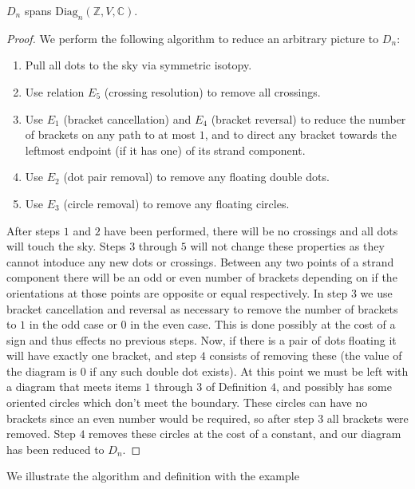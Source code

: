 \documentclass[11pt]{article} %
\begin{document}
\begin{prop}
$D_n$ spans $\text{Diag}_n({\mathbb{Z},V,\mathbb{C}})$.
\end{prop}
\begin{proof}
We perform the following algorithm to reduce an arbitrary picture to $D_n$:
\begin{enumerate}
\item Pull all dots to the sky via symmetric isotopy.
\item Use relation $E_5$ (crossing resolution) to remove all crossings.
\item Use $E_1$ (bracket cancellation) and $E_4$ (bracket reversal) to reduce the number of brackets on any path to at most $1$, and to direct any bracket towards the leftmost endpoint (if it has one) of its strand component.
\item Use $E_2$ (dot pair removal) to remove any floating double dots. 
\item Use $E_3$ (circle removal) to remove any floating circles.
\end{enumerate}
After steps $1$ and $2$ have been performed, there will be no crossings and all dots will touch the sky. Steps $3$ through $5$ will not change these properties as they cannot intoduce any new dots or crossings. Between any two points of a strand component there will be an odd or even number of brackets depending on if the orientations at those points are opposite or equal respectively. In step 3 we use bracket cancellation and reversal as necessary to remove the number of brackets to $1$ in the odd case or $0$ in the even case. This is done possibly at the cost of a sign and thus effects no previous steps. Now, if there is a pair of dots floating it will have exactly one bracket, and step $4$ consists of removing these (the value of the diagram is $0$ if any such double dot exists). At this point we must be left with a diagram that meets items $1$ through $3$ of Definition $4$, and possibly has some oriented circles which don't meet the boundary. These circles can have no brackets since an even number would be required, so after step $3$ all brackets were removed. Step $4$ removes these circles at the cost of a constant, and our diagram has been reduced to $D_n$.
\end{proof}

We illustrate the algorithm and definition with the example \hspace{2mm}
\end{document}
